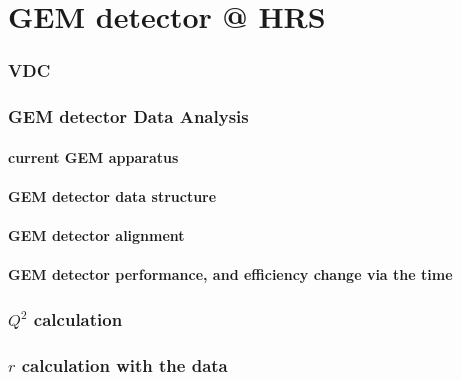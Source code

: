 \chapter{GEM detector @ HRS}
\subsection{VDC}
\subsection{GEM detector Data Analysis}
\subsubsection{current GEM apparatus}
\subsubsection{GEM detector data structure}
\subsubsection{GEM detector alignment}
\subsubsection{GEM detector performance, and efficiency change via the time}
\subsection{$Q^2$ calculation}
\subsection{$r$ calculation with the data}

